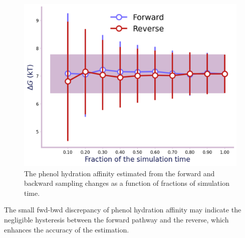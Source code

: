 \documentclass[9pt,tutorial]{livecoms}
\begin{document}
\begin{figure}[h!t]
\centering
\includegraphics[width=0.9\linewidth]{Supp-Files/AFEP-Hydration/output/Alchemlyb/output_11_1.png}
\caption{The phenol hydration affinity estimated from the forward and backward sampling changes as a function of fractions of simulation time.}
\label{fig:AFEP-Hyd-1}
\end{figure}

The small fwd-bwd discrepancy of phenol hydration affinity may indicate the negligible hysteresis between the forward pathway and the reverse, which enhances the accuracy of the estimation.
\end{document}
